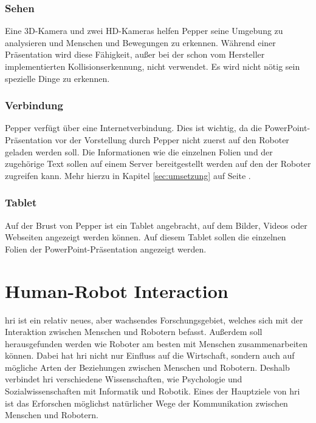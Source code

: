 \subsubsection{Sehen}\label{sec:sehen}
Eine 3D-Kamera und zwei HD-Kameras helfen Pepper seine Umgebung zu analysieren
und Menschen und Bewegungen zu erkennen. \cite{SoftBankII2018} Während einer
Präsentation wird diese Fähigkeit, außer bei der schon vom Hersteller implementierten
Kollisionserkennung, nicht verwendet. Es wird nicht nötig sein spezielle Dinge
zu erkennen.

\subsubsection{Verbindung}\label{sec:verbindung}
Pepper verfügt über eine Internetverbindung. \cite{SoftBankII2018} Dies ist
wichtig, da die PowerPoint-Präsentation vor der Vorstellung durch Pepper nicht zuerst auf den
Roboter geladen werden soll. Die Informationen wie die einzelnen Folien und der
zugehörige Text sollen auf einem Server bereitgestellt werden auf den der
Roboter zugreifen kann. Mehr hierzu in Kapitel \ref{sec:umsetzung} auf Seite
\pageref{sec:umsetzung}.

\subsubsection{Tablet}\label{sec:tablet}
Auf der Brust von Pepper ist ein Tablet angebracht, auf dem Bilder, Videos oder
Webseiten angezeigt werden können. \cite{SoftBankII2018} Auf diesem Tablet
sollen die einzelnen Folien der PowerPoint-Präsentation angezeigt werden.

\section{Human-Robot Interaction}\label{sec:hri}
\ac{hri} ist ein relativ neues, aber wachsendes Forschungsgebiet, welches sich
mit der Interaktion zwischen Menschen und Robotern befasst. Außerdem soll
herausgefunden werden wie Roboter am besten mit Menschen zusammenarbeiten
können. Dabei hat \ac{hri} nicht nur Einfluss auf die Wirtschaft, sondern auch
auf mögliche Arten der Beziehungen zwischen Menschen und Robotern. Deshalb
verbindet \ac{hri} verschiedene Wissenschaften, wie Psychologie und
Sozialwissenschaften mit Informatik und Robotik. Eines der Hauptziele von
\ac{hri} ist das Erforschen möglichst natürlicher Wege der Kommunikation
zwischen Menschen und Robotern. \cite{Dautenhahn2011}

